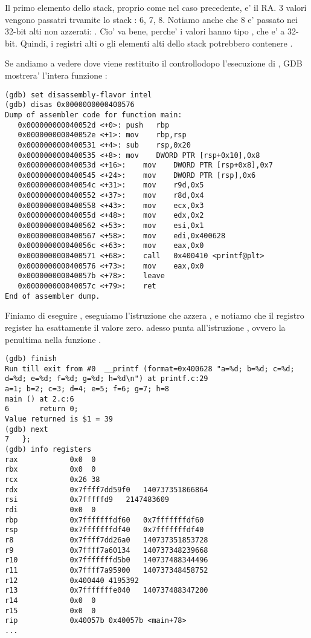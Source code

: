 Il primo elemento dello stack, proprio come nel caso precedente, e' il {RA}.
3 valori vengono passatri trvamite lo stack : 6, 7, 8.
Notiamo anche che 8 e' passato nei 32-bit alti non azzerati: .
Cio' va bene, perche' i valori hanno tipo \Tint , che e' a 32-bit.
Quindi, i registri alti o gli elementi alti dello stack potrebbero contenere .

Se andiamo a vedere dove viene restituito il controllodopo l'esecuzione di \printf, 
\ac{GDB} mostrera' l'intera funzione \main:

\begin{lstlisting}[style=customasm]
(gdb) set disassembly-flavor intel
(gdb) disas 0x0000000000400576
Dump of assembler code for function main:
   0x000000000040052d <+0>:	push   rbp
   0x000000000040052e <+1>:	mov    rbp,rsp
   0x0000000000400531 <+4>:	sub    rsp,0x20
   0x0000000000400535 <+8>:	mov    DWORD PTR [rsp+0x10],0x8
   0x000000000040053d <+16>:	mov    DWORD PTR [rsp+0x8],0x7
   0x0000000000400545 <+24>:	mov    DWORD PTR [rsp],0x6
   0x000000000040054c <+31>:	mov    r9d,0x5
   0x0000000000400552 <+37>:	mov    r8d,0x4
   0x0000000000400558 <+43>:	mov    ecx,0x3
   0x000000000040055d <+48>:	mov    edx,0x2
   0x0000000000400562 <+53>:	mov    esi,0x1
   0x0000000000400567 <+58>:	mov    edi,0x400628
   0x000000000040056c <+63>:	mov    eax,0x0
   0x0000000000400571 <+68>:	call   0x400410 <printf@plt>
   0x0000000000400576 <+73>:	mov    eax,0x0
   0x000000000040057b <+78>:	leave  
   0x000000000040057c <+79>:	ret    
End of assembler dump.
\end{lstlisting}

Finiamo di eseguire \printf, eseguiamo l'istruzione che azzera \EAX, e notiamo che il registro \EAX register ha esattamente il valore zero.
\RIP adesso punta all'istruzione  , ovvero la penultima nella funzione \main.

\begin{lstlisting}
(gdb) finish
Run till exit from #0  __printf (format=0x400628 "a=%d; b=%d; c=%d; d=%d; e=%d; f=%d; g=%d; h=%d\n") at printf.c:29
a=1; b=2; c=3; d=4; e=5; f=6; g=7; h=8
main () at 2.c:6
6		return 0;
Value returned is $1 = 39
(gdb) next
7	};
(gdb) info registers
rax            0x0	0
rbx            0x0	0
rcx            0x26	38
rdx            0x7ffff7dd59f0	140737351866864
rsi            0x7fffffd9	2147483609
rdi            0x0	0
rbp            0x7fffffffdf60	0x7fffffffdf60
rsp            0x7fffffffdf40	0x7fffffffdf40
r8             0x7ffff7dd26a0	140737351853728
r9             0x7ffff7a60134	140737348239668
r10            0x7fffffffd5b0	140737488344496
r11            0x7ffff7a95900	140737348458752
r12            0x400440	4195392
r13            0x7fffffffe040	140737488347200
r14            0x0	0
r15            0x0	0
rip            0x40057b	0x40057b <main+78>
...
\end{lstlisting}
